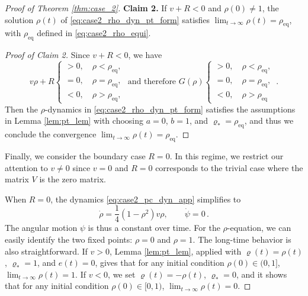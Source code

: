 \documentclass[10pt]{article}
\theoremstyle{definition}
\theoremstyle{definition}
\numberwithin{equation}{section}
\newcommand{\Drho}{\Dot{\rho}}
\newcommand{\Dpsi}{\Dot{\psi}}
\newcommand{\rhoEq}{\rho_{\mathrm{eq}}}
\begin{document}
\begin{proof}[Proof of Theorem \ref{thm:case_2}]
\textbf{Claim 2.} If $v + R < 0$ and $\rho(0) \neq 1$, the solution $\rho(t)$ of \eqref{eq:case2_rho_dyn_pt_form} satisfies $\lim_{t \rightarrow \infty} \rho(t) = \rhoEq$, with $\rhoEq$ defined in \eqref{eq:case2_rho_equi}.
\begin{proof}[Proof of Claim 2]
Since $v + R < 0$, we have
\[
    v \rho + R 
    \begin{cases}
        > 0, \quad \rho < \rho_{\mathrm{eq}}, \\
        = 0, \quad \rho = \rho_{\mathrm{eq}}, \\
        < 0, \quad \rho > \rho_{\mathrm{eq}},
    \end{cases}
    \text{ and therefore }
    G(\rho) 
    \begin{cases}
        > 0, \quad \rho < \rho_{\mathrm{eq}}, \\
        = 0, \quad \rho = \rho_{\mathrm{eq}}, \\
        < 0, \quad \rho > \rho_{\mathrm{eq}} 
    \end{cases} \, .
\]
Then the $\rho$-dynamics in \eqref{eq:case2_rho_dyn_pt_form} satisfies the assumptions in Lemma \ref{lem:pt_lem} with choosing $a=0$, $b=1$, and $\varrho_* = \rhoEq$, and thus we conclude the convergence $\lim_{t \rightarrow \infty} \rho(t) = \rhoEq$.
\end{proof}

Finally, we consider the boundary case $R = 0$.
In this regime, we restrict our attention to $v \neq 0$ since $v = 0$ and $R = 0$ corresponds to the trivial case where the matrix $V$ is the zero matrix.

When $R = 0$, the dynamics \eqref{eq:case2_pc_dyn_app} simplifies to 
\begin{equation*}
\Drho = \frac{1}{4} (1 - \rho^2) v \rho, \qquad \Dpsi = 0 \, .
\end{equation*}
The angular motion $\psi$ is thus a constant over time.
For the $\rho$-equation, we can easily identify the two fixed points: $\rho = 0$ and $\rho = 1$.
The long-time behavior is also straightforward.
If $v > 0$, Lemma \ref{lem:pt_lem}, applied with $\varrho(t) = \rho(t)$, $\varrho_* = 1$, and $e(t) = 0$, gives that for any initial condition $\rho(0) \in (0,1]$, $\lim_{t \rightarrow \infty} \rho(t) = 1$.
If $v < 0$, we set $\varrho(t) = -\rho(t)$, $\varrho_* = 0$, and it shows that for any initial condition $\rho(0) \in [0,1)$, $\lim_{t \rightarrow \infty} \rho(t) = 0$.


\end{proof}
\end{document}
